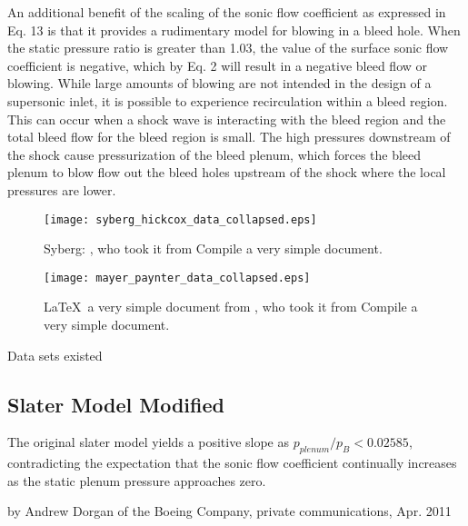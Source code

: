 An additional benefit of the scaling of the sonic flow coefficient as expressed in Eq. 13 is that it provides a rudimentary model for blowing in a bleed hole. When the static pressure ratio is greater than 1.03, the value of the surface sonic flow coefficient is negative, which by Eq. 2 will result in a negative bleed flow or blowing. While large amounts of blowing are not intended in the design of a supersonic inlet, it is possible to experience recirculation within a bleed region. This can occur when a shock wave is interacting with the bleed region and the total bleed flow for the bleed region is small. The high pressures downstream of the shock cause pressurization of the bleed plenum, which forces the bleed plenum to blow flow out the bleed holes upstream of the shock where the local pressures are lower.



\begin{figure}[htbp] \begin{center}
    \texttt{[image: syberg\_hickcox\_data\_collapsed.eps]}
    \caption{Syberg: \cite{Slater2012}, who took it from \cite{Willis1995} Compile a very simple document.}
     \label{fig:syberg_data_collapsed} \end{center}
\end{figure}

\begin{figure}[htbp]
 \begin{center}
    \texttt{[image: mayer\_paynter\_data\_collapsed.eps]}
     \caption{\LaTeX\ a very simple document from \cite{Slater2012}, who took it from \cite{Willis1995} Compile a very simple document.}
     \label{fig:mayer_data_collapsed}
 \end{center}
\end{figure}

Data sets existed




\subsection{Slater Model Modified}

The original slater model yields a positive slope as $p_{plenum}/p_B < 0.02585 $, contradicting the expectation that the sonic flow coefficient continually increases as the static plenum pressure approaches zero.

by Andrew Dorgan of the Boeing Company, private communications, Apr. 2011

